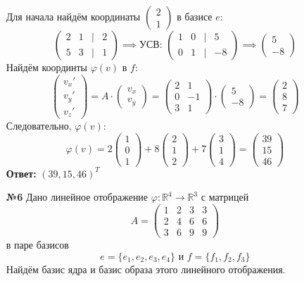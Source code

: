 \documentclass[a4paper]{article}
\newcommand{\mat}[1]{\begin{pmatrix} #1 \end{pmatrix}}
\renewcommand{\phi}{\varphi}
\begin{document}
\begin{enumerate}
    Для начала найдём координаты $\mat{2\\1}$ в базисе $e$:
    $$\mat{2 & 1 & | & 2\\5 & 3 & | & 1} \implies \text{УСВ: } \mat{
        1 & 0 & | & 5 \\
        0 & 1 & | & -8
    } \implies \mat{5 \\ -8}$$
    Найдём координты $\phi(v)$ в $f$:
    $$\mat{v_x'\\ v_y' \\v_z'} = A \cdot \mat{v_x \\ v_y} = \begin{pmatrix}2 & 1 \\ 0 & -1 \\ 3 & 1\end{pmatrix} \cdot \mat{5 \\ -8} =
    \mat{2 \\
    8 \\
    7}$$
    Следовательно, $\phi(v)$:
    $$\phi(v) = 2\begin{pmatrix}1 \\ 0 \\ 1\end{pmatrix} + 8\begin{pmatrix}2 \\ 1 \\ 2\end{pmatrix}+7\begin{pmatrix}3 \\ 1 \\ 4\end{pmatrix}=
    \mat{39 \\
    15 \\
    46}$$
    \textbf{Ответ:} $(39, 15, 46)^{T}$
    
    \item[\textbf{№6}]Дано линейное отображение $\varphi: \mathbb{R}^{4} \rightarrow \mathbb{R}^{3}$ 
    с матрицей 
    $$A=\begin{pmatrix} 1 & 2 & 3 & 3 \\ 2 & 4 & 6 & 6 \\ 3 & 6 & 9 & 9 \end{pmatrix}$$ 
    в паре базисов 
    $$e=\{e_{1}, e_{2}, e_{3}, e_{4}\} \text{ и } f = \{f_{1}, f_{2}, f_{3}\}$$
    Найдём базис ядра и базис образа этого линейного отображения.
    

\end{enumerate}
\end{document}
